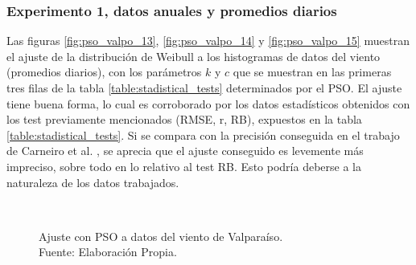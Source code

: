\subsubsection{Experimento 1, datos anuales y promedios diarios}
Las figuras \ref{fig:pso_valpo_13}, \ref{fig:pso_valpo_14} y \ref{fig:pso_valpo_15} muestran el ajuste de la distribución de Weibull a los histogramas de datos del viento (promedios diarios), con los parámetros $k$ y $c$  que se muestran en las primeras tres filas de la tabla \ref{table:stadistical_tests} determinados por el PSO. El ajuste tiene buena forma, lo cual es corroborado por los datos estadísticos obtenidos con los test previamente mencionados (RMSE, r, RB), expuestos en la tabla \ref{table:stadistical_tests}. Si se compara con la precisión conseguida en el trabajo de Carneiro et al. \cite{Carneiro15}, se aprecia que el ajuste conseguido es levemente más impreciso, sobre todo en lo relativo al test RB. Esto podría deberse a la naturaleza de los datos 
trabajados.\\
\begin{figure}[ht!]
    \centering
        \\
    \caption{Ajuste con PSO a datos del viento de Valparaíso.\\ Fuente: Elaboración Propia.}
    \label{fig:subfigures}
\end{figure}

